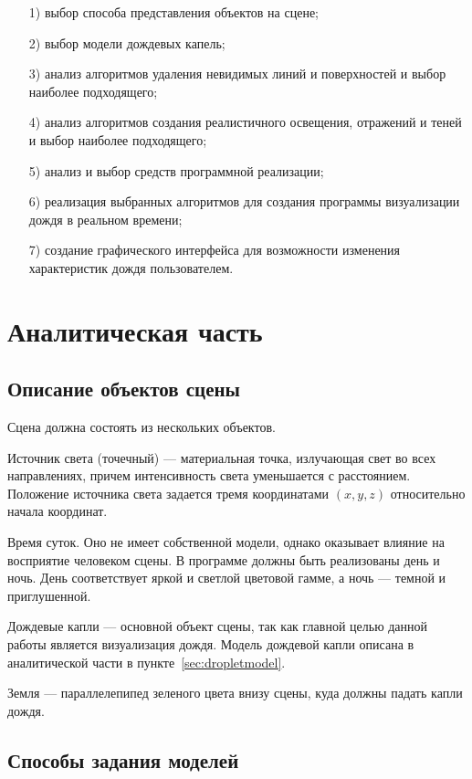 \begin{enumerate}
\item[1)]
выбор способа представления объектов на сцене;
\item[2)]
выбор модели дождевых капель;
\item[3)]
анализ алгоритмов удаления невидимых линий и поверхностей и выбор наиболее подходящего;
\item[4)]
анализ алгоритмов создания реалистичного освещения, отражений и теней и выбор наиболее подходящего;
\item[5)]
анализ и выбор средств программной реализации;
\item[6)]
реализация выбранных алгоритмов для создания программы визуализации дождя в реальном времени;
\item[7)]
создание графического интерфейса для возможности изменения характеристик дождя пользователем.
\end{enumerate}

\chapter{Аналитическая часть}

\section{Описание объектов сцены}

Сцена должна состоять из нескольких объектов.

Источник света (точечный) --- материальная точка, излучающая свет во всех направлениях, причем интенсивность света уменьшается с расстоянием. 
Положение источника света задается тремя координатами $(x, y, z)$ относительно начала координат.

Время суток. 
Оно не имеет собственной модели, однако оказывает влияние на восприятие человеком сцены. 
В программе должны быть реализованы день и ночь. 
День соответствует яркой и светлой цветовой гамме, а ночь --- темной и приглушенной.

Дождевые капли --- основной объект сцены, так как главной целью данной работы является визуализация дождя. 
Модель дождевой капли описана в аналитической части в пункте~\ref{sec:dropletmodel}.

Земля --- параллелепипед зеленого цвета внизу сцены, куда должны падать капли дождя. 

\section{Способы задания моделей}

